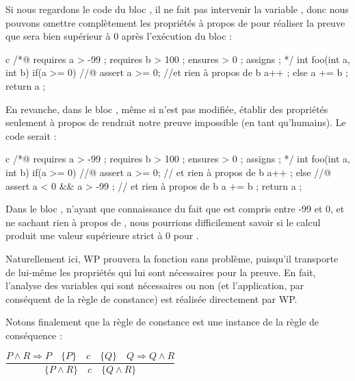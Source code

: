 \documentclass[middle]{zmdocument}
\begin{document}
Si nous regardons le code du bloc , il ne fait pas intervenir la variable
, donc nous pouvons omettre complètement les propriétés à propos de   pour
réaliser la preuve que  sera bien supérieur à 0 après l'exécution du bloc :



\begin{CodeBlock}{c}
/*@
  requires a > -99 ;
  requires b > 100 ;
  ensures  \result > 0 ;
  assigns  \nothing ;
*/
int foo(int a, int b){
  if(a >= 0){
    //@ assert a >= 0; //et rien à propos de b
    a++ ;
  } else {
    a += b ;
  }
  return a ;
}
\end{CodeBlock}



En revanche, dans le bloc , même si  n'est pas modifiée, établir
des propriétés seulement à propos de  rendrait notre preuve impossible (en
tant qu'humains). Le code serait :



\begin{CodeBlock}{c}
/*@
  requires a > -99 ;
  requires b > 100 ;
  ensures  \result > 0 ;
  assigns  \nothing ;
*/
int foo(int a, int b){
  if(a >= 0){
    //@ assert a >= 0; // et rien à propos de b
    a++ ;
  } else {
    //@ assert a < 0 && a > -99 ; // et rien à propos de b
    a += b ;
  }
  return a ;
}
\end{CodeBlock}



Dans le bloc , n'ayant que connaissance du fait que  est compris
entre -99 et 0, et ne sachant rien à propos de , nous pourrions 
difficilement savoir si le calcul  produit une valeur supérieure
strict à 0 pour .



Naturellement ici, WP prouvera la fonction sans problème, puisqu'il transporte
de lui-même les propriétés qui lui sont nécessaires pour la preuve. En fait,
l'analyse des variables qui sont nécessaires ou non (et l'application, par 
conséquent de la règle de constance) est réalisée directement par WP.



Notons finalement que la règle de constance est une instance de la règle de 
conséquence :




\begin{center}
$\dfrac{P \wedge R \Rightarrow P \quad \{P\}\quad c\quad \{Q\} \quad Q \Rightarrow Q \wedge R}{\{P \wedge R\}\quad c\quad \{Q \wedge R\}}$


\end{center}
\end{document}
